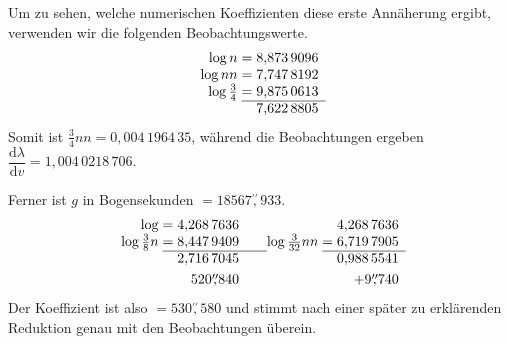 \par\noindent\hspace*{\parindent}Um zu sehen, welche numerischen Koeffizienten diese erste
Annäherung ergibt, verwenden wir die folgenden Beobachtungswerte.
\[
\begin{array}{r@{\;}c@{\;}r}
\log n&=&8{,}873\,9096\\
\log nn&=&7{,}747\,8192\\
\log\tfrac34&=&9{,}875\,0613\\\cline{2-3}
&&7{,}622\,8805
\end{array}
\]
\noindent Somit ist \(\tfrac34nn=0{,}004\,1964\,35\), während die Beobachtungen ergeben
\(\dfrac{\mathrm{d}\lambda}{\mathrm{d}v}=1{,}004\,0218\,706\).

\par\noindent\hspace*{\parindent}Ferner ist \(g\) in Bogensekunden \(=18567\overset{\prime\prime}{,}933\).
\[
\begin{array}{r@{\;}c@{\;}r@{\qquad}r@{\;}c@{\;}r}
\log&=&4{,}268\,7636&&&4{,}268\,7636\\
\log\tfrac38n&=&8{,}447\,9409&\log\tfrac{3}{32}nn&=&6{,}719\,7905\\\cline{2-3}\cline{5-6}
&&2{,}716\,7045&&&0{,}988\,5541\\[3pt]
&&520\overset{\prime\prime}{,}840&&&+9\overset{\prime\prime}{,}740
\end{array}
\]
\noindent Der Koeffizient ist also \(=530\overset{\prime\prime}{,}580\) und stimmt nach einer
später zu erklärenden Reduktion genau mit den Beobachtungen überein.
\clearpage
\endgroup
